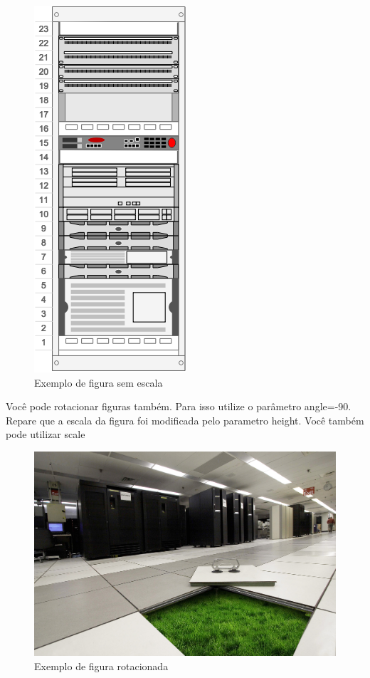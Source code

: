 \documentclass[	DIV=calc,%
							paper=a4,%
							fontsize=12pt,%
							onecolumn]{scrartcl}	 					%
\begin{document}
\begin{figure}
	\centering
	\includegraphics[]{fig2}
	\caption{Exemplo de figura sem escala}
	\label{fig2}
\end{figure}

Você pode rotacionar figuras também. Para isso utilize o parâmetro angle=-90. Repare que a escala da figura foi modificada pelo parametro height. Você também pode utilizar scale

\begin{figure}
	\centering
	\includegraphics[height=\textwidth,angle=-90]{fig3}
	\caption{Exemplo de figura rotacionada}
	\label{fig3}
\end{figure}


\end{document}
